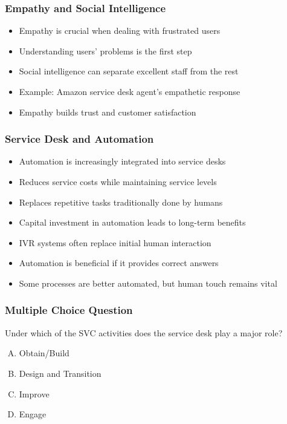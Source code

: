 \documentclass[aspectratio=169, table]{beamer}
\begin{document}
\begin{frame}
	\frametitle{Empathy and Social Intelligence}
	\begin{itemize}
		\item Empathy is crucial when dealing with frustrated users
		\item Understanding users' problems is the first step
		\item Social intelligence can separate excellent staff from the rest
		\item Example: Amazon service desk agent's empathetic response
		\item Empathy builds trust and customer satisfaction
	\end{itemize}
\end{frame}

\begin{frame}
	\frametitle{Service Desk and Automation}
	\begin{itemize}
		\item Automation is increasingly integrated into service desks
		\item Reduces service costs while maintaining service levels
		\item Replaces repetitive tasks traditionally done by humans
		\item Capital investment in automation leads to long-term benefits
		\item IVR systems often replace initial human interaction
		\item Automation is beneficial if it provides correct answers
		\item Some processes are better automated, but human touch remains vital
	\end{itemize}
\end{frame}

\begin{frame}
	\frametitle{Multiple Choice Question}
	
	Under which of the SVC activities does the service desk play a major role?
	
	\begin{enumerate}[A.]
		\item Obtain/Build
		\item Design and Transition
		\item Improve
		\item Engage
	\end{enumerate}
	
\end{frame}
\end{document}
